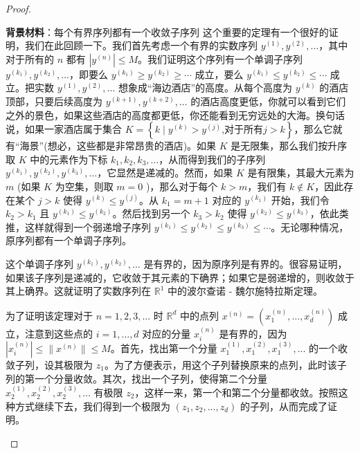 \begin{proof}
\begin{mybox}{{\bf 背景材料}：每个有界序列都有一个收敛子序列}
这个重要的定理有一个很好的证明，我们在此回顾一下。我们首先考虑一个有界的实数序列 \({y}^{\left( 1\right) },{y}^{\left( 2\right) },\ldots\)，其中对于所有的 \(n\) 都有 \(| {y}^{\left( n\right) }|  \leq  M\)。我们证明这个序列有一个单调子序列 \({y}^{\left( {k}_{1}\right) },{y}^{\left( {k}_{2}\right) },\ldots\)，即要么 \({y}^{\left( {k}_{1}\right) } \geq  {y}^{\left( {k}_{2}\right) } \geq  \cdots\) 成立，要么 \({y}^{\left( {k}_{1}\right) } \leq  {y}^{\left( {k}_{2}\right) } \leq  \cdots\) 成立。把实数 \({y}^{\left( 1\right) },{y}^{\left( 2\right) },\ldots\) 想象成“海边酒店”的高度。从每个高度为 \({y}^{\left( k\right) }\) 的酒店顶部，只要后续高度为 \({y}^{\left( k + 1\right) },{y}^{\left( k + 2\right) },\ldots\) 的酒店高度更低，你就可以看到它们之外的景色，如果这些酒店的高度都更低，你还能看到无穷远处的大海。换句话说，如果一家酒店属于集合 \(K = \left\{  {k \mid  {y}^{\left( k\right) } > {y}^{\left( j\right) }\text{,对于所有}j > k}\right\}\)，那么它就有“海景”(想必，这些都是非常昂贵的酒店)。如果 \(K\) 是无限集，那么我们按升序取 \(K\) 中的元素作为下标 \({k}_{1},{k}_{2},{k}_{3},\ldots\)，从而得到我们的子序列 \({y}^{\left( {k}_{1}\right) },{y}^{\left( {k}_{2}\right) },{y}^{\left( {k}_{3}\right) },\ldots\)，它显然是递减的。然而，如果 \(K\) 是有限集，其最大元素为 \(m\) (如果 \(K\) 为空集，则取 \(m = 0\) )，那么对于每个 \(k > m\)，我们有 \(k \notin  K\)，因此存在某个 \(j > k\) 使得 \({y}^{\left( k\right) } \leq  {y}^{\left( j\right) }\)。从 \({k}_{1} = m + 1\) 对应的 \({y}^{\left( {k}_{1}\right) }\) 开始，我们令 \({k}_{2} > {k}_{1}\) 且 \({y}^{\left( {k}_{1}\right) } \leq  {y}^{\left( {k}_{2}\right) }\)。然后找到另一个 \({k}_{3} > {k}_{2}\) 使得 \({y}^{\left( {k}_{2}\right) } \leq  {y}^{\left( {k}_{3}\right) }\)，依此类推，这样就得到一个弱递增子序列 \({y}^{\left( {k}_{1}\right) } \leq  {y}^{\left( {k}_{2}\right) } \leq  {y}^{\left( {k}_{3}\right) } \leq  \cdots\)。无论哪种情况，原序列都有一个单调子序列。

这个单调子序列 \({y}^{\left( {k}_{1}\right) },{y}^{\left( {k}_{2}\right) },\ldots\) 是有界的，因为原序列是有界的。很容易证明，如果该子序列是递减的，它收敛于其元素的下确界；如果它是弱递增的，则收敛于其上确界。这就证明了实数序列在 \({\mathbb{R}}^{1}\) 中的波尔查诺 - 魏尔施特拉斯定理。

为了证明该定理对于 \(n = 1,2,3,\ldots\) 时 \({\mathbb{R}}^{d}\) 中的点列 \({x}^{\left( n\right) } = \left( {{x}_{1}^{\left( n\right) },\ldots,{x}_{d}^{\left( n\right) }}\right)\) 成立，注意到这些点的 \(i = 1,\ldots,d\) 对应的分量 \({x}_{i}^{\left( n\right) }\) 是有界的，因为 \(| {x}_{i}^{\left( n\right) }|  \leq \|{x}^{\left( n\right) }\| \leq  M\)。首先，找出第一个分量 \({x}_{1}^{\left( 1\right) },{x}_{1}^{\left( 2\right) },{x}_{1}^{\left( 3\right) },\ldots\) 的一个收敛子列，设其极限为 \({z}_{1}\)。为了方便表示，用这个子列替换原来的点列，此时该子列的第一个分量收敛。其次，找出一个子列，使得第二个分量 \({x}_{2}^{\left( 1\right) },{x}_{2}^{\left( 2\right) },{x}_{2}^{\left( 3\right) },\ldots\) 有极限 \({z}_{2}\)，这样一来，第一个和第二个分量都收敛。按照这种方式继续下去，我们得到一个极限为 \(\left( {{z}_{1},{z}_{2},\ldots,{z}_{d}}\right)\) 的子列，从而完成了证明。


\end{mybox}
\end{proof}
